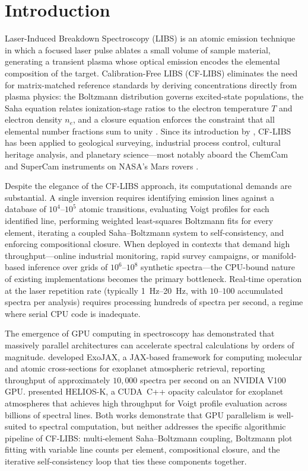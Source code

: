 \documentclass[preprint,12pt,authoryear]{elsarticle}
\begin{document}
\section{Introduction}
\label{sec:introduction}

Laser-Induced Breakdown Spectroscopy (LIBS) is an atomic emission technique in which a focused laser pulse ablates a small volume of sample material, generating a transient plasma whose optical emission encodes the elemental composition of the target.
Calibration-Free LIBS (CF-LIBS) eliminates the need for matrix-matched reference standards by deriving concentrations directly from plasma physics: the Boltzmann distribution governs excited-state populations, the Saha equation relates ionization-stage ratios to the electron temperature $T$ and electron density $n_e$, and a closure equation enforces the constraint that all elemental number fractions sum to unity \citep{Tognoni2010}.
Since its introduction by \citet{Ciucci1999}, CF-LIBS has been applied to geological surveying, industrial process control, cultural heritage analysis, and planetary science---most notably aboard the ChemCam and SuperCam instruments on NASA's Mars rovers \citep{Wiens2013,Maurice2021}.

Despite the elegance of the CF-LIBS approach, its computational demands are substantial.
A single inversion requires identifying emission lines against a database of $10^4$--$10^5$ atomic transitions, evaluating Voigt profiles for each identified line, performing weighted least-squares Boltzmann fits for every element, iterating a coupled Saha--Boltzmann system to self-consistency, and enforcing compositional closure.
When deployed in contexts that demand high throughput---online industrial monitoring, rapid survey campaigns, or manifold-based inference over grids of $10^6$--$10^8$ synthetic spectra---the CPU-bound nature of existing implementations becomes the primary bottleneck.
Real-time operation at the laser repetition rate (typically \SIrange{1}{20}{\hertz}, with $10$--$100$ accumulated spectra per analysis) requires processing hundreds of spectra per second, a regime where serial CPU code is inadequate.

The emergence of GPU computing in spectroscopy has demonstrated that massively parallel architectures can accelerate spectral calculations by orders of magnitude.
\citet{Kawahara2022} developed ExoJAX, a JAX-based framework for computing molecular and atomic cross-sections for exoplanet atmospheric retrieval, reporting throughput of approximately $10{,}000$ spectra per second on an NVIDIA V100 GPU.
\citet{Grimm2021} presented HELIOS-K, a CUDA~C++ opacity calculator for exoplanet atmospheres that achieves high throughput for Voigt profile evaluation across billions of spectral lines.
Both works demonstrate that GPU parallelism is well-suited to spectral computation, but neither addresses the specific algorithmic pipeline of CF-LIBS: multi-element Saha--Boltzmann coupling, Boltzmann plot fitting with variable line counts per element, compositional closure, and the iterative self-consistency loop that ties these components together.
\end{document}
